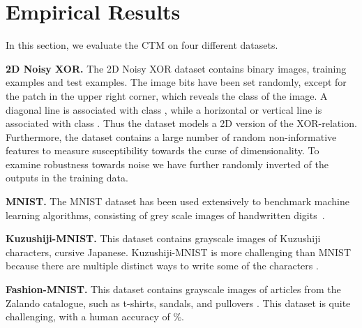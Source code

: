 \documentclass{article}
\begin{document}

\section{Empirical Results}
\label{sec:empirical_results}
In this section, we evaluate the CTM on four different datasets.



\textbf{2D Noisy XOR.} The 2D Noisy XOR dataset contains  binary images,  training examples and  test examples. The image bits have been set randomly, except for the  patch in the upper right corner, which reveals the class of the image. A diagonal line is associated with class , while a horizontal or vertical line is associated with class .
Thus the dataset models a 2D version of the XOR-relation. Furthermore, the dataset contains a large number of random non-informative features to measure susceptibility towards the curse of dimensionality. To examine robustness towards noise we have further randomly inverted  of the outputs in the training data.

\textbf{MNIST.} The MNIST dataset  has been used extensively to benchmark machine learning algorithms, consisting of  grey scale images of handwritten digits~\cite{lecun1998gradient}.

\textbf{Kuzushiji-MNIST.} This dataset contains  grayscale images of Kuzushiji characters, cursive Japanese. Kuzushiji-MNIST is more challenging than MNIST because there are multiple distinct ways to write some of the characters  \cite{Clanuwat2018}.

\textbf{Fashion-MNIST.} This dataset contains  grayscale images of articles from the Zalando catalogue, such as t-shirts, sandals, and pullovers  \cite{xiao2017}. This dataset is quite challenging, with a human accuracy of \%.
\end{document}
